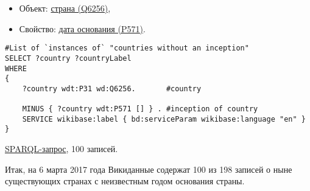 \begin{itemize}
    \item Объект: \href{https://www.wikidata.org/wiki/Q6256}{страна (Q6256)},
    \item Свойство: \href{https://www.wikidata.org/wiki/Property:P571}{дата основания (P571)}.
\end{itemize}

\begin{lstlisting}[language=SPARQL]
#List of `instances of` "countries without an inception" 
SELECT ?country ?countryLabel 
WHERE
{
    ?country wdt:P31 wd:Q6256.       #country
    
    MINUS { ?country wdt:P571 [] } . #inception of country
    SERVICE wikibase:label { bd:serviceParam wikibase:language "en" }
}
\end{lstlisting}

\href{https://query.wikidata.org/#%23List%20of%20%60instances%20of%60%20%22countries%20without%20a%20inception%22%20%0ASELECT%20%3Fcountry%20%3FcountryLabel%20%0AWHERE%0A%7B%0A%20%20%20%20%3Fcountry%20wdt%3AP31%20wd%3AQ6256.%20%23country%0A%20%20%20%20%0A%20%20%20%20MINUS%20%7B%20%3Fcountry%20wdt%3AP571%20%5B%5D%20%7D%20.%20%23inception%20of%20country%0A%20%20%20%20SERVICE%20wikibase%3Alabel%20%7B%20bd%3AserviceParam%20wikibase%3Alanguage%20%22en%22%20%7D%0A%7D%0A%0A}{SPARQL-запрос}, 100 записей.

Итак, на 6 марта 2017 года Викиданные содержат 100 из 198 записей о ныне существующих странах с неизвестным годом основания страны.